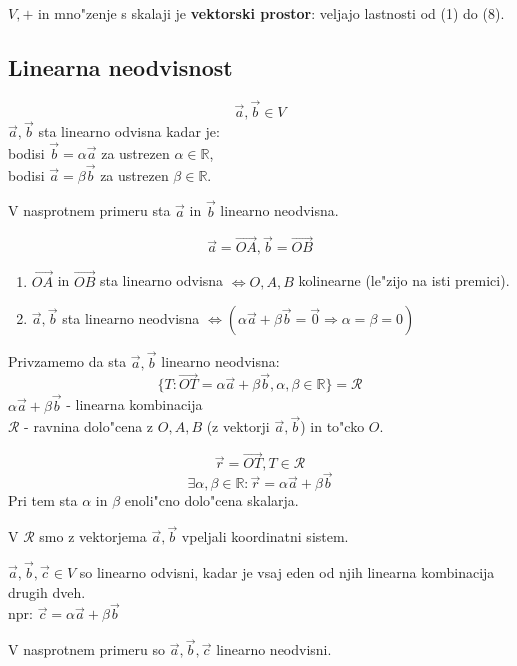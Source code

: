 \(V, +\) in mno"zenje s skalaji je \textbf{vektorski prostor}: veljajo lastnosti od (1) do (8).

\subsection{Linearna neodvisnost}
\[\vec{a}, \vec{b} \in V\]
\(\vec{a}, \vec{b}\) sta linearno odvisna kadar je:\\
\hspace*{10pt} bodisi \(\vec{b} = \alpha \vec{a}\) za ustrezen \(\alpha \in \mathbb{R}\),\\
\hspace*{10pt} bodisi \(\vec{a}  = \beta \vec{b}\) za ustrezen \(\beta \in \mathbb{R}\).

V nasprotnem primeru sta \(\vec{a}\) in \(\vec{b}\) linearno neodvisna.

\[\vec{a} = \vec{OA}, \vec{b} = \vec{OB}\]

\begin{enumerate}
	\item \(\vec{OA}\) in \(\vec{OB}\) sta linearno odvisna \(\Leftrightarrow O, A, B\) kolinearne (le"zijo na isti premici).
	\item \(\vec{a}, \vec{b}\) sta linearno neodvisna \(\Leftrightarrow (\alpha \vec{a} + \beta \vec{b} = \vec{0} \Rightarrow \alpha = \beta = 0)\)
\end{enumerate}

Privzamemo da sta \(\vec{a}, \vec{b}\) linearno neodvisna:
\[\{T: \vec{OT} = \alpha \vec{a} + \beta \vec{b}, \alpha, \beta \in \mathbb{R}\} = \mathcal{R}\]
\( \alpha \vec{a} + \beta \vec{b}\) - linearna kombinacija\\
\(\mathcal{R}\) - ravnina dolo"cena z \(O, A, B\) (z vektorji \(\vec{a}, \vec{b}\)) in to"cko \(O\).

\[\vec{r} = \vec{OT}, T \in \mathcal{R}\]
\[\exists \alpha, \beta \in \mathbb{R}: \vec{r} = \alpha \vec{a} + \beta \vec{b} \]
Pri tem sta \(\alpha\) in \(\beta\) enoli"cno dolo"cena skalarja.

V \(\mathcal{R}\) smo z vektorjema \(\vec{a}, \vec{b}\) vpeljali koordinatni sistem.

\(\vec{a}, \vec{b}, \vec{c} \in V\) so linearno odvisni, kadar je vsaj eden od njih linearna kombinacija drugih dveh.\\
npr: \(\vec{c} = \alpha \vec{a} + \beta \vec{b}\)

V nasprotnem primeru so \(\vec{a}, \vec{b}, \vec{c}\) linearno neodvisni.

